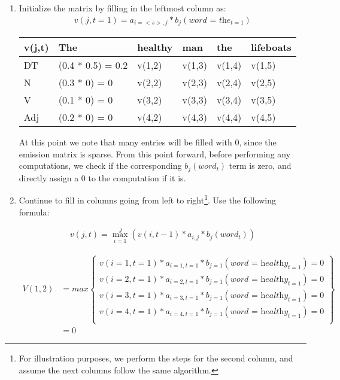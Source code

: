 \documentclass[12pt]{article}
\newcommand{\lp}{\left(}
\newcommand{\rp}{\right)}
\newenvironment{exercise}[2][Exercise]{\begin{trivlist}
\item[\hskip \labelsep {\bfseries #1}\hskip \labelsep {\bfseries #2.}]}{\end{trivlist}}
\begin{document}
\begin{exercise}{5. Viterbi}
\begin{enumerate}[label=(\alph*)]
\begin{enumerate}[label=\arabic*)]
	\item Initialize the matrix by filling in the leftmost column as:
	\begin{align*}
	 v(j,t=1) =  a_{i=<s>, j} * b_j(\textit{word = the}_{t=1})
	\end{align*}
	
	\begin{table}[H]
	\centering
	\begin{tabular}{|l|l|l|l|l|l|}
	\hline
	v(j,t) & The    & healthy & man    & the    & lifeboats \\ \hline
	DT     & (0.4 * 0.5) = 0.2 & v(1,2)  & v(1,3) & v(1,4) & v(1,5)    \\ \hline
	N      & (0.3 * 0) = 0 & v(2,2)  & v(2,3) & v(2,4) & v(2,5)    \\ \hline
	V      & (0.1 * 0) = 0 & v(3,2)  & v(3,3) & v(3,4) & v(3,5)    \\ \hline
	Adj    & (0.2 * 0) = 0 & v(4,2)  & v(4,3) & v(4,4) & v(4,5)    \\ \hline
	\end{tabular}
	\end{table}
	
	At this point we note that many entries will be filled with $0$, since the emission matrix is sparse. From this point forward, before performing any computations, we check if the corresponding  $b_j(\textit{word}_{t})$ term is zero, and directly assign a $0$ to the computation if it is.
	
	\item Continue to fill in columns going from left to right\footnote{For illustration purposes, we perform the steps for the second column, and assume the next columns follow the same algorithm.}. Use the following formula:
	
	\begin{align*}
	 v(j,t) = \max_{i=1}^J \lp v(i,t-1) * a_{i,j} * b_j(\textit{word}_t) \rp
	\end{align*}
	
	\begin{align*}
    V(1,2) &=  max\left\{\begin{array}{lr}
        v(i=1,t=1) * a_{i=1,t=1} * b_{j=1}(\textit{word = healthy}_{t=1}) = 0\\
        v(i=2, t=1) * a_{i=2,t=1} * b_{j=1}(\textit{word = healthy}_{t=1}) = 0 \\
        v(i=3, t=1) * a_{i=3,t=1} * b_{j=1}(\textit{word = healthy}_{t=1}) = 0\\
        v(i=4, t=1) * a_{i=4,t=1} * b_{j=1}(\textit{word = healthy}_{t=1}) = 0\\
        \end{array}\right\} \\ &= 0
  \end{align*}


\end{enumerate}
\end{enumerate}
\end{exercise}
\end{document}
